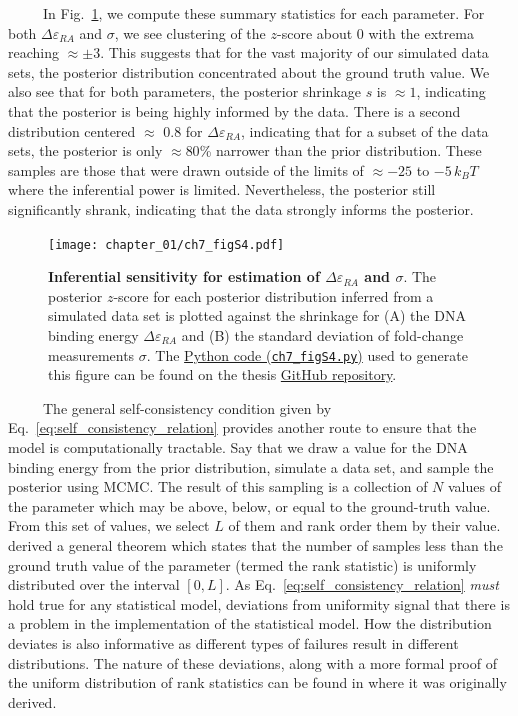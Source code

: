 \documentclass[12pt]{caltech_thesis}
\begin{document}
~~~~~In Fig.~\ref{fig:epRA_sbc_sensitivity}, we compute these summary
statistics for each parameter. For both \(\Delta\varepsilon_{RA}\) and
\(\sigma\), we see clustering of the \(z\)-score about 0 with the
extrema reaching \(\approx \pm 3\). This suggests that for the vast
majority of our simulated data sets, the posterior distribution
concentrated about the ground truth value. We also see that for both
parameters, the posterior shrinkage \(s\) is \(\approx 1\), indicating
that the posterior is being highly informed by the data. There is a
second distribution centered \(\approx\) 0.8 for
\(\Delta\varepsilon_{RA}\), indicating that for a subset of the data
sets, the posterior is only \(\approx 80\)\% narrower than the prior
distribution. These samples are those that were drawn outside of the
limits of \(\approx -25\) to \(-5\, k_BT\) where the inferential power
is limited. Nevertheless, the posterior still significantly shrank,
indicating that the data strongly informs the posterior.

\hypertarget{fig:epRA_sbc_sensitivity}{%
\begin{figure}
\centering
\texttt{[image: chapter\_01/ch7\_figS4.pdf]}
\caption[{Inferential sensitivity for estimation of the DNA binding
energy and homoscedastic error.}]{\textbf{Inferential sensitivity for
estimation of \(\Delta\varepsilon_{RA}\) and \(\sigma\)}. The posterior
\(z\)-score for each posterior distribution inferred from a simulated
data set is plotted against the shrinkage for (A) the DNA binding energy
\(\Delta\varepsilon_{RA}\) and (B) the standard deviation of fold-change
measurements \(\sigma\). The
\href{https://github.com/gchure/phd/blob/master/src/chapter_07/code/ch7_figS4.py}{Python
code (\texttt{ch7\_figS4.py})} used to generate this figure can be found
on the thesis \href{https://github.com/gchure/phd}{GitHub repository}.}
\label{fig:epRA_sbc_sensitivity}
\end{figure}
}

~~~~~The general self-consistency condition given by
Eq.~\ref{eq:self_consistency_relation} provides another route to ensure
that the model is computationally tractable. Say that we draw a value
for the DNA binding energy from the prior distribution, simulate a data
set, and sample the posterior using MCMC. The result of this sampling is
a collection of \(N\) values of the parameter which may be above, below,
or equal to the ground-truth value. From this set of values, we select
\(L\) of them and rank order them by their value. \textcite{talts2018}
derived a general theorem which states that the number of samples less
than the ground truth value of the parameter (termed the rank statistic)
is uniformly distributed over the interval \([0, L]\). As
Eq.~\ref{eq:self_consistency_relation} \emph{must} hold true for any
statistical model, deviations from uniformity signal that there is a
problem in the implementation of the statistical model. How the
distribution deviates is also informative as different types of failures
result in different distributions. The nature of these deviations, along
with a more formal proof of the uniform distribution of rank statistics
can be found in \textcite{talts2018} where it was originally derived.
\end{document}
